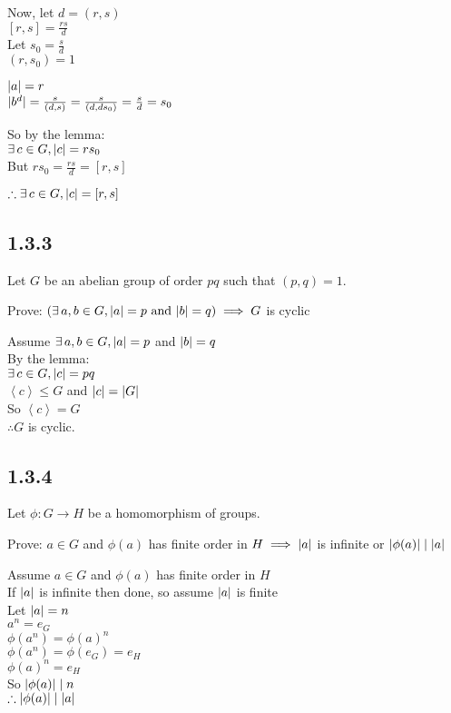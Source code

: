 \documentclass[letterpaper,12pt,fleqn]{article}
\newcommand{\cycle}[1]{\left<#1\right>}
\newcommand{\p}{\phi}
\begin{document}
Now, let $d=(r,s)$ \\
$[r,s]=\frac{rs}{d}$ \\
Let $s_0=\frac{s}{d}$ \\
$(r,s_0)=1$

$\lvert a\rvert=r$ \\
$\lvert b^d\rvert=\frac{s}{(d,s)}=\frac{s}{(d,ds_0)}=\frac{s}{d}=s_0$

So by the lemma: \\
$\exists\,c\in G,\lvert c\rvert=rs_0$ \\
But $rs_0=\frac{rs}{d}=[r,s]$

$\therefore\exists\,c\in G,\lvert c\rvert=[r,s]$

\subsection*{1.3.3}

Let $G$ be an abelian group of order $pq$ such that $(p,q)=1$.

Prove: $\left(\exists\,a,b\in G,\abs{a}=p\ \mbox{and}\ \abs{b}=q\right)\implies
G$ is cyclic

Assume $\exists\,a,b\in G,\lvert a\rvert=p$ and $\lvert b\rvert=q$ \\
By the lemma: \\
$\exists\,c\in G,\lvert c\rvert=pq$ \\
$\cycle{c}\le G$ and $\lvert c\rvert=\lvert G\rvert$ \\
So $\cycle{c}=G$ \\
$\therefore G$ is cyclic.

\subsection*{1.3.4}

Let $\p:G\to H$ be a homomorphism of groups.

Prove: $a\in G$ and $\p(a)$ has finite order in $H\implies\lvert a\rvert$ is infinite
or $\abs{\p(a)}\mid\abs{a}$

Assume $a\in G$ and $\p(a)$ has finite order in $H$ \\
If $\lvert a\rvert$ is infinite then done, so assume $\lvert a\rvert$ is finite \\
Let $\lvert a\rvert=n$ \\
$a^n=e_G$ \\
$\p(a^n)=\p(a)^n$ \\
$\p(a^n)=\p(e_G)=e_H$ \\
$\p(a)^n=e_H$ \\
So $\abs{\p(a)}\mid n$ \\
$\therefore\abs{\p(a)}\mid\abs{a}$
\end{document}
